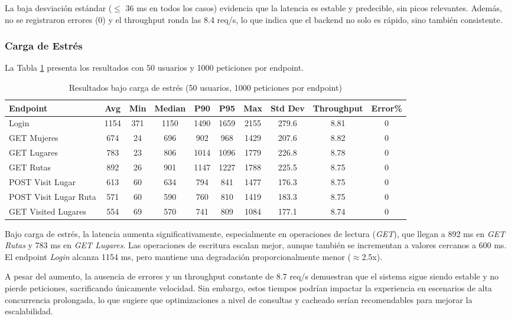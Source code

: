 La baja desviación estándar ($\leq$ 36 ms en todos los casos) evidencia que la latencia es estable y predecible, sin picos relevantes. Además, no se registraron errores (0) y el throughput ronda las 8.4 req/s, lo que indica que el backend no solo es rápido, sino también consistente. 
\subsubsection{Carga de Estrés}

La Tabla \ref{tab:stress} presenta los resultados con 50 usuarios y 1000 peticiones por endpoint.

\begin{table}[H]
\centering
\caption{Resultados bajo carga de estrés (50 usuarios, 1000 peticiones por endpoint)}
\label{tab:stress}
\scriptsize
\begin{tabular}{|l|c|c|c|c|c|c|c|c|c|}
\hline
\textbf{Endpoint} & \textbf{Avg} & \textbf{Min} & \textbf{Median} & \textbf{P90} & \textbf{P95} & \textbf{Max} & \textbf{Std Dev} & \textbf{Throughput} & \textbf{Error\%} \\
\hline
Login & 1154 & 371 & 1150 & 1490 & 1659 & 2155 & 279.6 & 8.81 & 0 \\
GET Mujeres & 674 & 24 & 696 & 902 & 968 & 1429 & 207.6 & 8.82 & 0 \\
GET Lugares & 783 & 23 & 806 & 1014 & 1096 & 1779 & 226.8 & 8.78 & 0 \\
GET Rutas & 892 & 26 & 901 & 1147 & 1227 & 1788 & 225.5 & 8.75 & 0 \\
POST Visit Lugar & 613 & 60 & 634 & 794 & 841 & 1477 & 176.3 & 8.75 & 0 \\
POST Visit Lugar Ruta & 571 & 60 & 590 & 760 & 810 & 1419 & 183.3 & 8.75 & 0 \\
GET Visited Lugares & 554 & 69 & 570 & 741 & 809 & 1084 & 177.1 & 8.74 & 0 \\
\hline
\end{tabular}
\end{table}
Bajo carga de estrés, la latencia aumenta significativamente, especialmente en operaciones de lectura (\textit{GET}), que llegan a 892 ms en \textit{GET Rutas} y 783 ms en \textit{GET Lugares}. Las operaciones de escritura escalan mejor, aunque también se incrementan a valores cercanos a 600 ms. El endpoint \textit{Login} alcanza 1154 ms, pero mantiene una degradación proporcionalmente menor ($\approx$2.5x).

A pesar del aumento, la ausencia de errores y un throughput constante de 8.7 req/s demuestran que el sistema sigue siendo estable y no pierde peticiones, sacrificando únicamente velocidad. Sin embargo, estos tiempos podrían impactar la experiencia en escenarios de alta concurrencia prolongada, lo que sugiere que optimizaciones a nivel de consultas y cacheado serían recomendables para mejorar la escalabilidad.

